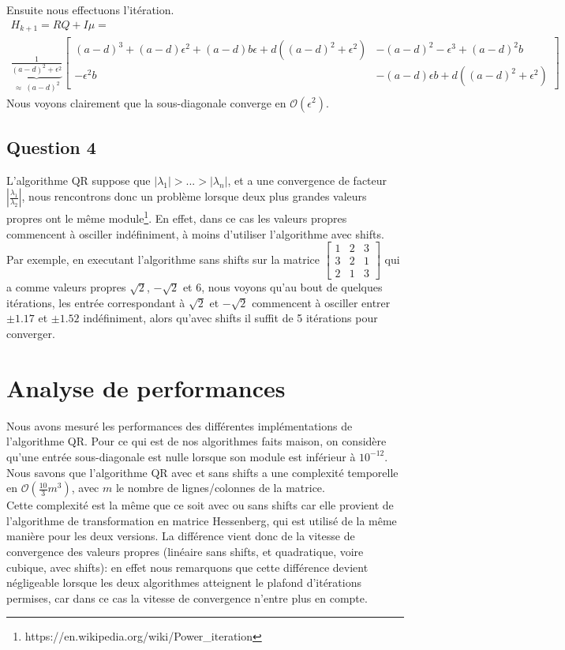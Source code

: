 \documentclass[11pt]{article}
\begin{document}
Ensuite nous effectuons l'itération.
\begin{align*}
	H_{k+1} = RQ + I\mu =~~~~~~~~~~~~~~~~~~~~~~~~~~~~~~~~~~~~~~~~~~\\ \underbrace{\frac{1}{(a-d)^2+\epsilon^2}}_{\approx ~(a-d)^2}
	\left[
		\begin{array}{cc}
			(a-d)^3+(a-d)\epsilon^2+(a-d)b\epsilon + d((a-d)^2+\epsilon^2) & -(a-d)^2-\epsilon^3+(a-d)^2b\\
			-\epsilon^2b & -(a-d)\epsilon b + d((a-d)^2+\epsilon^2)
		\end{array}
	\right]
\end{align*}
Nous voyons clairement que la sous-diagonale converge en $\mathcal{O}(\epsilon^2)$.

\subsection*{Question 4}
L'algorithme QR suppose que $|\lambda_1| > ... > |\lambda_n|$, et a une convergence de facteur $\left|\frac{\lambda_{1}}{\lambda_2}\right|$, nous rencontrons donc un problème lorsque deux plus grandes valeurs propres ont le même module\footnote{https://en.wikipedia.org/wiki/Power\_iteration}. En effet, dans ce cas les valeurs propres commencent à osciller indéfiniment, à moins d'utiliser l'algorithme avec shifts.\\
Par exemple, en executant l'algorithme sans shifts sur la matrice $\left[\begin{array}{ccc}
	1 & 2 & 3\\ 3 & 2 & 1\\ 2 & 1 & 3
\end{array}\right]$ qui a comme valeurs propres $\sqrt{2}$, $-\sqrt{2}$ et $6$, nous voyons qu'au bout de quelques itérations, les entrée correspondant à $\sqrt{2}$ et $-\sqrt{2}$ commencent à osciller entrer $\pm1.17$ et $\pm1.52$ indéfiniment, alors qu'avec shifts il suffit de 5 itérations pour converger.

\section*{Analyse de performances}

Nous avons mesuré les performances des différentes implémentations de l'algorithme QR. Pour ce qui est de nos algorithmes faits maison, on considère qu'une entrée sous-diagonale est nulle lorsque son module est inférieur à $10^{-12}$.\\
Nous savons que l'algorithme QR avec et sans shifts a une complexité temporelle en $\mathcal{O}(\frac{10}{3}m^3)$, avec $m$ le nombre de lignes/colonnes de la matrice.\\
Cette complexité est la même que ce soit avec ou sans shifts car elle provient de l'algorithme de transformation en matrice Hessenberg, qui est utilisé de la même manière pour les deux versions. La différence vient donc de la vitesse de convergence des valeurs propres (linéaire sans shifts, et quadratique, voire cubique, avec shifts): en effet nous remarquons que cette différence devient négligeable lorsque les deux algorithmes atteignent le plafond d'itérations permises, car dans ce cas la vitesse de convergence n'entre plus en compte.
\end{document}

